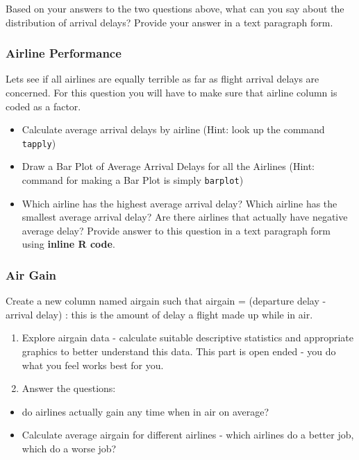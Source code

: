 \documentclass[
]{article}
\begin{document}
Based on your answers to the two questions above, what can you say about
the distribution of arrival delays? Provide your answer in a text
paragraph form.

\hypertarget{airline-performance}{%
\subsubsection{Airline Performance}\label{airline-performance}}

Lets see if all airlines are equally terrible as far as flight arrival
delays are concerned. For this question you will have to make sure that
airline column is coded as a factor.

\begin{itemize}
\item
  Calculate average arrival delays by airline (Hint: look up the command
  \texttt{tapply})
\item
  Draw a Bar Plot of Average Arrival Delays for all the Airlines (Hint:
  command for making a Bar Plot is simply \texttt{barplot})
\item
  Which airline has the highest average arrival delay? Which airline has
  the smallest average arrival delay? Are there airlines that actually
  have negative average delay? Provide answer to this question in a text
  paragraph form using \textbf{inline R code}.
\end{itemize}

\hypertarget{air-gain}{%
\subsubsection{Air Gain}\label{air-gain}}

Create a new column named airgain such that airgain = (departure delay -
arrival delay) : this is the amount of delay a flight made up while in
air.

\begin{enumerate}
\def\labelenumi{\alph{enumi})}
\item
  Explore airgain data - calculate suitable descriptive statistics and
  appropriate graphics to better understand this data. This part is open
  ended - you do what you feel works best for you.
\item
  Answer the questions:
\end{enumerate}

\begin{itemize}
\item
  do airlines actually gain any time when in air on average?
\item
  Calculate average airgain for different airlines - which airlines do a
  better job, which do a worse job?
\end{itemize}
\end{document}
